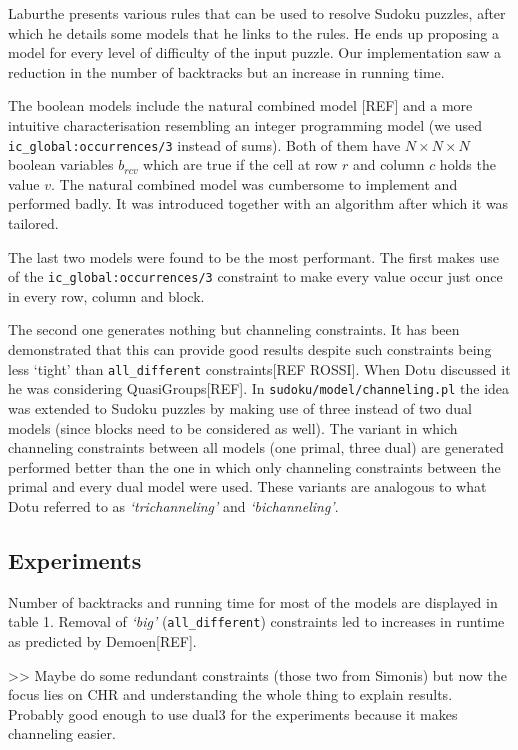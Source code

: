 Laburthe presents various rules that can be used to resolve Sudoku puzzles, after which he details some models that he links to the rules. He ends up proposing a model for every level of difficulty of the input puzzle. Our implementation saw a reduction in the number of backtracks but an increase in running time. \\\par

The boolean models include the natural combined model [REF] and a more intuitive characterisation resembling an integer programming model (we used \texttt{ic\_global:occurrences/3} instead of sums). Both of them have $N\times N\times N$ boolean variables $b_{rcv}$ which are true if the cell at row $r$ and column $c$ holds the value $v$. The natural combined model was cumbersome to implement and performed badly. It was introduced together with an algorithm after which it was tailored.\\\par

The last two models were found to be the most performant. The first makes use of the \texttt{ic\_global:occurrences/3} constraint to make every value occur just once in every row, column and block. 
\par The second one generates nothing but channeling constraints. It has been demonstrated that this can provide good results despite such constraints being less `tight' than \texttt{all\_different} constraints[REF ROSSI]. When Dotu discussed it he was considering QuasiGroups[REF]. In \texttt{sudoku/model/channeling.pl} the idea was extended to Sudoku puzzles by making use of three instead of two dual models (since blocks need to be considered as well). The variant in which channeling constraints between all models (one primal, three dual) are generated performed better than the one in which only channeling constraints between the primal and every dual model were used. These variants are analogous to what Dotu referred to as \textit{`trichanneling'} and \textit{`bichanneling'}. \\\par

\subsection{Experiments}

Number of backtracks and running time for most of the models are displayed in table 1. Removal of \textit{`big'} (\texttt{all\_different}) constraints led to increases in runtime as predicted by Demoen[REF]. \\\par

>> Maybe do some redundant constraints (those two from Simonis) but now the focus lies on CHR and understanding the whole thing to explain results. Probably good enough to use dual3 for the experiments because it makes channeling easier.